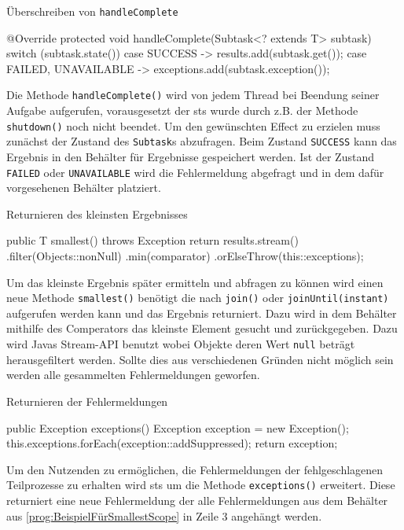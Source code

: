     \begin{program} [H]
        \caption{Überschreiben von \texttt{handleComplete}}
        \label{prog:ÜberschreibenVonHandleComplete}
    \begin{JavaCode}[language=Java, numbers=left]
@Override
protected void handleComplete(Subtask<? extends T> subtask) {
    switch (subtask.state()) {
        case SUCCESS -> results.add(subtask.get());
        case FAILED, UNAVAILABLE -> {
            exceptions.add(subtask.exception());
        }
    }
}\end{JavaCode}
    \end{program}
    Die Methode \texttt{handleComplete()} wird von jedem Thread bei Beendung seiner Aufgabe aufgerufen, vorausgesetzt der \gls{sts} wurde durch z.B. der Methode 
    \texttt{shutdown()} noch nicht beendet.
    Um den gewünschten Effect zu erzielen muss zunächst der Zustand des \texttt{Subtask}s abzufragen. Beim Zustand \texttt{SUCCESS} kann das Ergebnis in den Behälter für Ergebnisse
    gespeichert werden. Ist der Zustand \texttt{FAILED} oder \texttt{UNAVAILABLE} wird die Fehlermeldung abgefragt und in dem dafür vorgesehenen Behälter platziert.

    \begin{program} [H]
        \caption{Returnieren des kleinsten Ergebnisses}
        \label{prog:ReturnierenDesKleinstenErgebnisses}
    \begin{JavaCode}[language=Java, numbers=left]
public T smallest() throws Exception {
return results.stream()
        .filter(Objects::nonNull)
        .min(comparator)
        .orElseThrow(this::exceptions);
}\end{JavaCode}
    \end{program}
    Um das kleinste Ergebnis später ermitteln und abfragen zu können wird einen neue Methode \texttt{smallest()} benötigt die nach \texttt{join()} oder
    \texttt{joinUntil(instant)} aufgerufen werden kann und das Ergebnis returniert. Dazu wird in dem Behälter mithilfe des Comperators das kleinste Element gesucht
    und zurückgegeben. Dazu wird Javas Stream-API benutzt wobei Objekte deren Wert \texttt{null} beträgt herausgefiltert werden. Sollte dies aus verschiedenen Gründen nicht möglich sein werden alle gesammelten Fehlermeldungen geworfen. 
    \begin{program} [H]
        \caption{Returnieren der Fehlermeldungen}
        \label{prog:ReturnierenDerFehlermeldungen}
    \begin{JavaCode}[language=Java, numbers=left]
public Exception exceptions() {
    Exception exception = new Exception();
    this.exceptions.forEach(exception::addSuppressed);
    return exception;
}\end{JavaCode}
    \end{program}
    Um den Nutzenden zu ermöglichen, die Fehlermeldungen der fehlgeschlagenen Teilprozesse zu erhalten wird \gls{sts} um die Methode \texttt{exceptions()} erweitert.
    Diese returniert eine neue Fehlermeldung der alle Fehlermeldungen aus dem Behälter aus \ref{prog:BeispielFürSmallestScope} in Zeile 3 angehängt werden.

